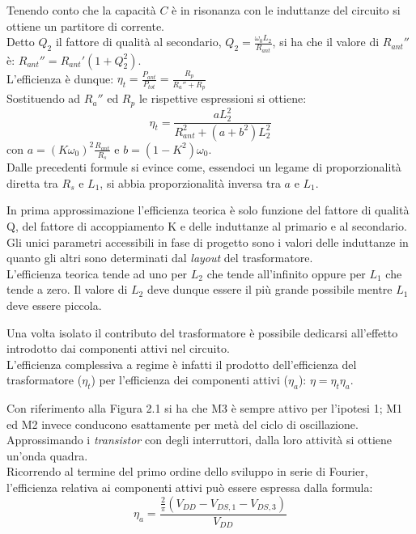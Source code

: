 \documentclass[a4paper, 12pt]{memoir}
\begin{document}
\noindent Tenendo conto che la capacità $C$ è in risonanza con le induttanze
del circuito si ottiene un partitore di corrente.\\
Detto $Q_2$ il fattore di qualità al secondario, 
$Q_2 = \frac{\omega_0 L_2}{R_{ant}}$, si ha che il  valore di $ R_{ant}'' $ è:
$ R_{ant}'' = R_{ant}' \left(1 + Q_2^2 \right) $.\\
L'efficienza è dunque:
$ \eta_t = \frac{P_{ant}}{P_{tot}} = \frac{R_p}{R_a'' + R_p} $\\
Sostituendo ad $R_a''$ ed $R_p$ le rispettive espressioni si ottiene:
$$ \eta_t = \frac{a L_2^2}{R_{ant}^2 + (a + b^2)L_2^2} $$
con $a=(K\omega_0)^2\frac{R_{ant}}{R_s}$ e $ b = (1 - K^2) \omega_0$.\\
Dalle precedenti formule si evince come, essendoci un legame di proporzionalità
diretta tra $R_s$ e $L_1$, si abbia proporzionalità inversa tra $a$ e $L_1$.

In prima approssimazione l'efficienza teorica è solo funzione del
fattore di qualità Q, del fattore di accoppiamento K e delle induttanze al 
primario e al secondario.\\
Gli unici parametri accessibili in fase di progetto sono i valori delle
induttanze in quanto gli altri sono determinati dal \emph{layout} del
trasformatore.\\
L'efficienza teorica tende ad uno per $L_2$ che tende all'infinito oppure per
$L_1$ che tende a zero. Il valore di $L_2$ deve dunque essere il più grande 
possibile mentre $L_1$ deve essere piccola.

Una volta isolato il contributo del trasformatore è possibile dedicarsi 
all'effetto introdotto dai componenti attivi nel circuito.\\
L'efficienza complessiva a regime è infatti il prodotto dell'efficienza del
trasformatore ($\eta_t$) per l'efficienza dei componenti attivi ($\eta_a$):
$ \eta = \eta_t \eta_a $.

Con riferimento alla Figura 2.1 si ha che M3 è sempre attivo per l'ipotesi 1;
M1 ed M2 invece conducono esattamente per metà del ciclo di oscillazione.\\
Approssimando i \emph{transistor} con degli interruttori, dalla loro attività
si ottiene un'onda quadra.\\
Ricorrendo al termine del primo ordine dello sviluppo in serie di Fourier, 
l'efficienza relativa ai componenti attivi può essere espressa dalla formula:
\cite{Neviani14}$$ \eta_a=\frac{\frac{2}{\pi}\left(V_{DD}-V_{DS,1}-V_{DS,3}
\right)}{V_{DD}}$$
\end{document}

